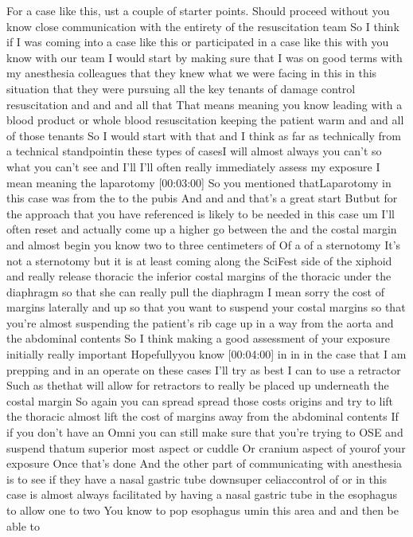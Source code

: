 \documentclass[
]{book}
\begin{document}
For a case like this, ust a couple of starter points. Should proceed
without you know close communication with the entirety of the
resuscitation team So I think if I was coming into a case like this or
participated in a case like this with you know with our team I would
start by making sure that I was on good terms with my anesthesia
colleagues that they knew what we were facing in this in this situation
that they were pursuing all the key tenants of damage control
resuscitation and and and all that That means meaning you know leading
with a blood product or whole blood resuscitation keeping the patient
warm and and all of those tenants So I would start with that and I think
as far as technically from a technical standpointin these types of
casesI will almost always you can't so what you can't see and I'll I'll
often really immediately assess my exposure I mean meaning the
laparotomy {[}00:03:00{]} So you mentioned thatLaparotomy in this case was
from the to the pubis And and and that's a great start Butbut for the
approach that you have referenced is likely to be needed in this case um
I'll often reset and actually come up a higher go between the and the
costal margin and almost begin you know two to three centimeters of Of a
of a sternotomy It's not a sternotomy but it is at least coming along
the SciFest side of the xiphoid and really release thoracic the inferior
costal margins of the thoracic under the diaphragm so that she can
really pull the diaphragm I mean sorry the cost of margins laterally and
up so that you want to suspend your costal margins so that you're almost
suspending the patient's rib cage up in a way from the aorta and the
abdominal contents So I think making a good assessment of your exposure
initially really important Hopefullyyou know {[}00:04:00{]} in in in the
case that I am prepping and in an operate on these cases I'll try as
best I can to use a retractor Such as thethat will allow for retractors
to really be placed up underneath the costal margin So again you can
spread spread those costs origins and try to lift the thoracic almost
lift the cost of margins away from the abdominal contents If if you
don't have an Omni you can still make sure that you're trying to OSE and
suspend thatum superior most aspect or cuddle Or cranium aspect of
yourof your exposure Once that's done And the other part of
communicating with anesthesia is to see if they have a nasal gastric
tube downsuper celiaccontrol of or in this case is almost always
facilitated by having a nasal gastric tube in the esophagus to allow one
to two You know to pop esophagus umin this area and and then be able to
\end{document}
